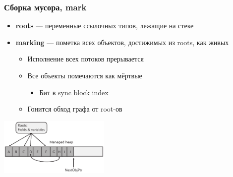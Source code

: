 \documentclass[xetex,mathserif,serif]{beamer}
\begin{document}
    \begin{frame}
        \frametitle{Сборка мусора, mark}
        \begin{itemize}
            \item \textbf{roots} --- переменные ссылочных типов, лежащие на стеке
            \item \textbf{marking} --- пометка всех объектов, достижимых из roots, как живых
            \begin{itemize}
                \item Исполнение всех потоков прерывается
                \item Все объекты помечаются как мёртвые
                \begin{itemize}
                    \item Бит в sync block index
                \end{itemize}
                \item Гонится обход графа от root-ов
            \end{itemize}
        \end{itemize}
        \begin{center}
            \includegraphics[width=0.4\textwidth]{heapBeforeCollection.png}
        \end{center}
    \end{frame}
\end{document}
